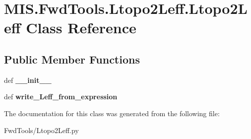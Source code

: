 \hypertarget{classMIS_1_1FwdTools_1_1Ltopo2Leff_1_1Ltopo2Leff}{}\section{M\+I\+S.\+Fwd\+Tools.\+Ltopo2\+Leff.\+Ltopo2\+Leff Class Reference}
\label{classMIS_1_1FwdTools_1_1Ltopo2Leff_1_1Ltopo2Leff}
\subsection*{Public Member Functions}
\begin{DoxyCompactItemize}
\item 
\mbox{\label{classMIS_1_1FwdTools_1_1Ltopo2Leff_1_1Ltopo2Leff_a27dacf81d943408a572dfaf1c477a92c}} 
def {\bfseries \+\_\+\+\_\+init\+\_\+\+\_\+}
\item 
\mbox{\label{classMIS_1_1FwdTools_1_1Ltopo2Leff_1_1Ltopo2Leff_a2f4d5112c1d9d1ed742cf58c8afbc904}} 
def {\bfseries write\+\_\+\+Leff\+\_\+from\+\_\+expression}
\end{DoxyCompactItemize}


The documentation for this class was generated from the following file\+:\begin{DoxyCompactItemize}
\item 
Fwd\+Tools/Ltopo2\+Leff.\+py\end{DoxyCompactItemize}
